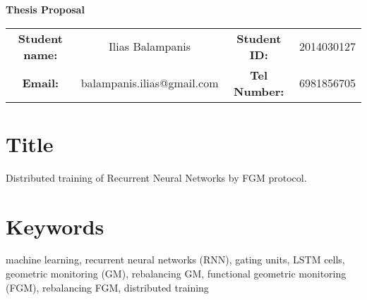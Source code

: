 \documentclass{article}
\begin{document}
    \begin{center}
        \LARGE{\textbf{Thesis Proposal}}\\[.5cm]

        \begin{table}[h!]

            \begin{tabular}{ c c c c }
                \hspace{-1.3cm}
                \textbf{Student name:} & Ilias Balampanis & \textbf{Student ID:} & 2014030127  \\
                \hspace{-1.5cm}
                \textbf{Email:} & balampanis.ilias@gmail.com &  \textbf{Tel Number:} & 6981856705 \\
            \end{tabular}
        \end{table}

    \end{center}


    \section*{Title}
    Distributed training of Recurrent Neural Networks by FGM protocol.

    \section*{Keywords}
    machine learning, recurrent neural networks (RNN), gating units, LSTM cells, geometric monitoring (GM), rebalancing GM, functional geometric monitoring (FGM), rebalancing FGM, distributed training

\end{document}
